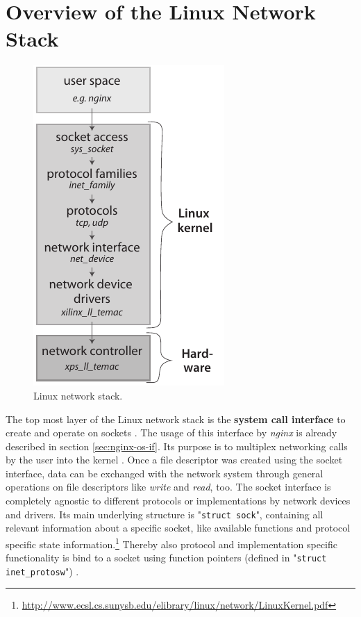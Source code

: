 \chapter{Overview of the Linux Network Stack}

\begin{figure}
	\centering
	\includegraphics[scale=1]{images/net-stack.pdf}
	\caption{Linux network stack.}
	\label{fig:net-stack}
\end{figure}
The top most layer of the Linux network stack is the \textbf{system call interface} to create and operate on sockets \cite{netstackana}. The usage of this interface by \textit{nginx} is already described in section \ref{sec:nginx-os-if}. Its purpose is to multiplex networking calls by the user into the kernel \cite{netstackana}. Once a file descriptor was created using the socket interface, data can be exchanged with the network system through general operations on file descriptors like \textit{write} and \textit{read}, too. The socket interface is completely agnostic to different protocols or implementations by network devices and drivers. Its main underlying structure is "\texttt{struct sock}", containing all relevant information about a specific socket, like available functions and protocol specific state information.\footnote{\url{http://www.ecsl.cs.sunysb.edu/elibrary/linux/network/LinuxKernel.pdf}} Thereby also protocol and implementation specific functionality is bind to a socket using function pointers (defined in "\texttt{struct inet\_protosw}") \cite{netstackana}.

